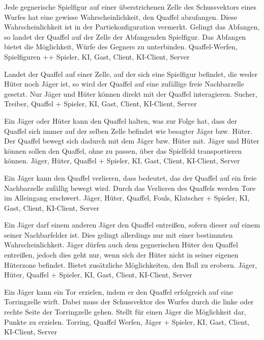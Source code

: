         {Jede gegnerische Spielfigur auf einer überstrichenen Zelle des Schussvektors eines Wurfes hat eine gewisse Wahrscheinlichkeit, den Quaffel abzufangen. Diese Wahrscheinlichkeit ist in der Partiekonfiguration vermerkt. Gelingt das Abfangen, so landet der Quaffel auf der Zelle der Abfangenden Spielfigur.}
        {Das Abfangen bietet die Möglichkeit, Würfe des Gegners zu unterbinden.}
        {Quaffel-Werfen, Spielfiguren }
        {++}
        {Spieler, KI, Gast, Client, KI-Client, Server}
        
        {Landet der Quaffel auf einer Zelle, auf der sich eine Spielfigur befindet, die weder Hüter noch Jäger ist, so wird der Quaffel auf eine zufällige freie Nachbarzelle gesetzt.}
        {Nur Jäger und Hüter können direkt mit der Quaffel interagieren.}
        {Sucher, Treiber, Quaffel}
        {+}
        {Spieler, KI, Gast, Client, KI-Client, Server}		
        
        {Ein Jäger oder Hüter kann den Quaffel halten, was zur Folge hat, dass der Quaffel sich immer auf der selben Zelle befindet wie besagter Jäger bzw. Hüter. Der Quaffel bewegt sich dadurch mit dem Jäger bzw. Hüter mit.}
        {Jäger und Hüter können sollen den Quaffel, ohne zu passen, über das Spielfeld transportieren können.}
        {Jäger, Hüter, Quaffel}
        {+}
        {Spieler, KI, Gast, Client, KI-Client, Server}	
        
        {Ein Jäger kann den Quaffel verlieren, dass bedeutet, das der Quaffel auf ein freie Nachbarzelle zufällig bewegt wird.}
        {Durch das Verlieren des Quaffels werden Tore im Alleingang erschwert.}
        {Jäger, Hüter, Quaffel, Fouls, Klatscher}
        {+}
        {Spieler, KI, Gast, Client, KI-Client, Server}
    
        {Ein Jäger darf einem anderen Jäger den Quaffel entreißen, sofern dieser auf einem seiner Nachbarfelder ist. Dies gelingt allerdings nur mit einer bestimmten Wahrscheinlichkeit. Jäger dürfen auch dem gegnerischen Hüter den Quaffel entreißen, jedoch dies geht nur, wenn sich der Hüter nicht in seiner eigenen Hüterzone befindet.}
        {Bietet zusätzliche Möglichkeiten, den Ball zu erobern.}
        {Jäger, Hüter, Quaffel}
        {+}
        {Spieler, KI, Gast, Client, KI-Client, Server}

        {Ein Jäger kann ein Tor erzielen, indem er den Quaffel erfolgreich auf eine Torringzelle wirft. Dabei muss der Schussvektor des Wurfes durch die linke oder rechte Seite der Torringzelle gehen.}
        {Stellt für einen Jäger die Möglichkeit dar, Punkte zu erzielen.}
        {Torring, Quaffel Werfen, Jäger}
        {+}
        {Spieler, KI, Gast, Client, KI-Client, Server}
        

